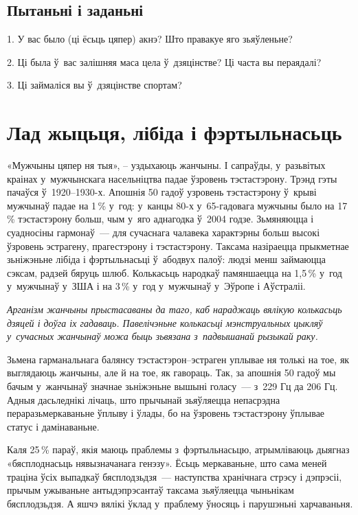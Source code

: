 \subsection*{Пытаньні і заданьні}

1. У вас было (ці ёсьць цяпер) акнэ? Што правакуе яго зьяўленьне?

2. Ці была ў~вас залішняя маса цела ў~дзяцінстве? Ці часта вы пераядалі?

3. Ці займаліся вы ў~дзяцінстве спортам?


\section{Лад жыцьця, лібіда і фэртыльнасьць}

«Мужчыны цяпер ня тыя», -- уздыхаюць жанчыны. І сапраўды, у~разьвітых краінах у~мужчынскага насельніцтва падае ўзровень тэстастэрону. Трэнд гэты пачаўся ў~1920--1930-х. Апошнія 50 гадоў узровень тэстастэрону ў~крыві мужчынаў падае на 1\,\% у~год: у~канцы 80-х у~65-гадовага мужчыны было на 17\,\% тэстастэрону больш, чым у~яго аднагодка ў~2004 годзе. Зьмяняюцца і суадносіны гармонаў~--- для сучаснага чалавека характэрны больш высокі ўзровень эстрагену, прагестэрону і тэстастэрону. Таксама назіраецца прыкметнае зьніжэньне лібіда і фэртыльнасьці ў~абодвух палоў: людзі менш займаюцца сэксам, радзей бяруць шлюб. Колькасьць народкаў памяншаецца на 1,5\,\% у~год у~мужчынаў у~ЗША і на 3\,\% у~год у~мужчынаў у~Эўропе і Аўстраліі.

\emph{Арганізм жанчыны прыстасаваны да таго, каб нараджаць вялікую колькасьць дзяцей і доўга іх гадаваць. Павелічэньне колькасьці мэнструальных цыкляў у~сучасных жанчынаў можа быць зьвязана з~падвышанай рызыкай раку.}

Зьмена гарманальнага балянсу тэстастэрон--эстраген уплывае ня толькі на тое, як выглядаюць жанчыны, але й на тое, як гавораць. Так, за апошнія 50 гадоў мы бачым у~жанчынаў значнае зьніжэньне вышыні голасу~--- з~229 Гц да 206 Гц. Адныя дасьледнікі лічаць, што прычынай зьяўляецца непасрэдна пераразьмеркаваньне ўплыву і ўлады, бо на ўзровень тэстастэрону ўплывае статус і дамінаваньне.

Каля 25\,\% параў, якія маюць праблемы з~фэртыльнасьцю, атрымліваюць дыягназ «бясплоднасьць нявызначанага генэзу». Ёсьць меркаваньне, што сама меней траціна ўсіх выпадкаў бясплодзьдзя~--- наступства хранічнага стрэсу і дэпрэсіі, прычым ужываньне антыдэпрэсантаў таксама зьяўляецца чыньнікам бясплодзьдзя. А яшчэ вялікі ўклад у~праблему ўносяць і парушэньні харчаваньня.

